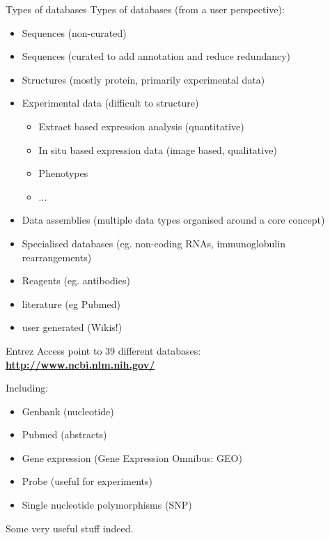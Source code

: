 \documentclass[pdf]{beamer}
\begin{document}
\begin{frame}{Types of databases}
  Types of databases (from a user perspective):\\
  {\small
  \begin{itemize}
    \item Sequences (non-curated)
    \item Sequences (curated to add annotation and reduce redundancy)
    \item Structures (mostly protein, primarily experimental data)
    \item Experimental data (difficult to structure)
      {\small
      \begin{itemize}
        \item Extract based expression analysis (quantitative)
        \item In situ based expression data (image based, qualitative)
        \item Phenotypes
        \item ...
      \end{itemize}
      }
    \item Data assemblies (multiple data types organised around a core concept)
    \item Specialised databases (eg. non-coding RNAs, immunoglobulin rearrangements)
    \item Reagents (eg. antibodies)
    \item literature (eg Pubmed)
    \item user generated (Wikis!)
  \end{itemize}
  \par
}
\end{frame}

\begin{frame}{Entrez}
  Access point to 39 different databases:\\
  
  {
    \bf \url{http://www.ncbi.nlm.nih.gov/}
  }
  
  Including:
  \begin{itemize}
    \item Genbank (nucleotide)
    \item Pubmed (abstracts)
    \item Gene expression (Gene Expression Omnibus: GEO)
    \item Probe (useful for experiments)
    \item Single nucleotide polymorphisms (SNP)
  \end{itemize}
  Some very useful stuff indeed.
\end{frame}
\end{document}
